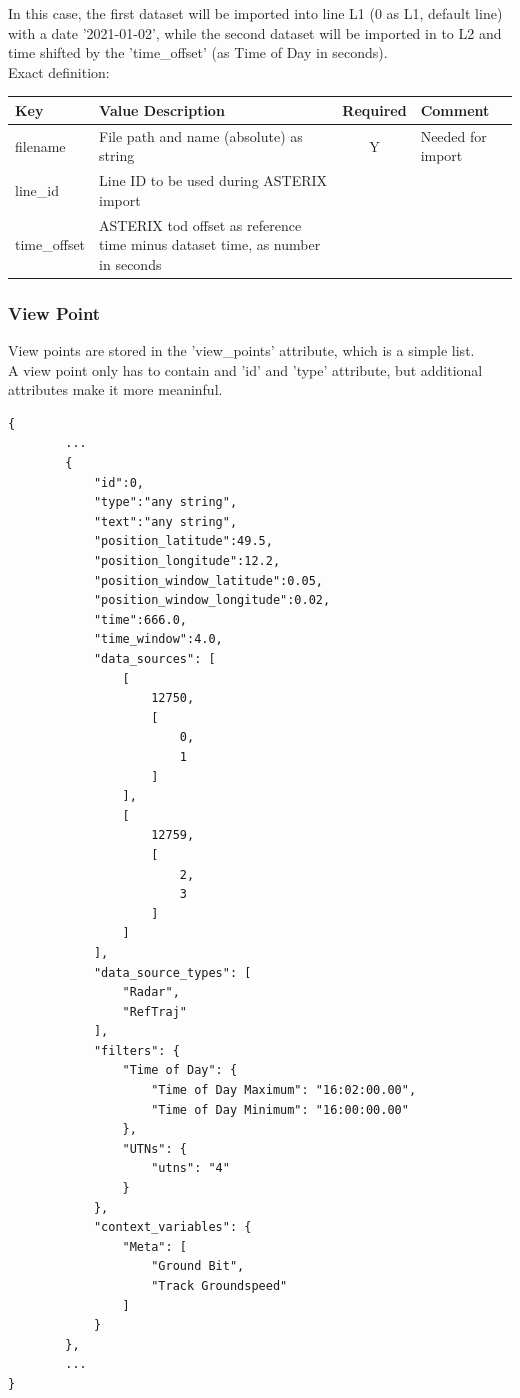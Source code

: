 In this case, the first dataset will be imported into line L1 (0 as L1, default line) with a date '2021-01-02', 
while the second dataset will be imported in to L2 and time shifted by the 'time\_offset' (as Time of Day in seconds). \\

Exact definition:

\begin{center}
 \begin{table}[H]
  \begin{tabularx}{\textwidth}{ | l | X | c | X | }
    \hline
    \textbf{Key} & \textbf{Value Description} & \textbf{Required} & \textbf{Comment} \\ \hline
    filename & File path and name (absolute) as string & Y & Needed for import \\ \hline
    line\_id & Line ID to be used during ASTERIX import & & \\ \hline
    time\_offset & ASTERIX tod offset as reference time minus dataset time, as number in seconds & & \\ \hline
\end{tabularx}
\end{table}
\end{center}

\subsubsection{View Point}

View points are stored in the 'view\_points' attribute, which is a simple list. \\

A view point only has to contain and 'id' and 'type' attribute, but additional attributes make it more meaninful.

\begin{lstlisting}[basicstyle=\small\ttfamily]
{
        ...
        {
            "id":0,
            "type":"any string",
            "text":"any string",
            "position_latitude":49.5,
            "position_longitude":12.2,
            "position_window_latitude":0.05,
            "position_window_longitude":0.02,
            "time":666.0,
            "time_window":4.0,
            "data_sources": [
                [
                    12750,
                    [
                        0,
                        1
                    ]
                ],
                [
                    12759,
                    [
                        2,
                        3
                    ]
                ]
            ],
            "data_source_types": [
                "Radar",
                "RefTraj"
            ],
            "filters": {
                "Time of Day": {
                    "Time of Day Maximum": "16:02:00.00",
                    "Time of Day Minimum": "16:00:00.00"
                },
                "UTNs": {
                    "utns": "4"
                }
            },
            "context_variables": {
                "Meta": [
                    "Ground Bit",
                    "Track Groundspeed"
                ]
            }
        },
        ...
}
\end{lstlisting}


